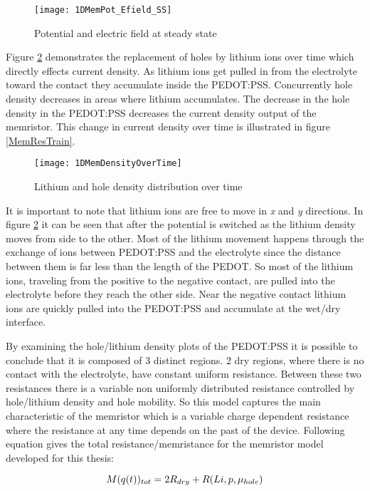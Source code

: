 \begin{doublespace}
\begin{figure}[!htp]
\centering
\texttt{[image: 1DMemPot\_Efield\_SS]}
\caption{Potential and electric field at steady state} 
\label{MemEss}
\end{figure}

Figure \ref{MempLi} demonstrates the replacement of holes by lithium ions over time which directly effects current density.  As lithium ions get pulled in from the electrolyte toward the contact they accumulate inside the PEDOT:PSS. Concurrently hole density decreases in areas where lithium accumulates. The decrease in the hole density in the PEDOT:PSS decreases the current density output of the memristor. This change in current density over time is illustrated in figure \ref{MemResTrain}.

\begin{figure}[!htp]
\centering
\texttt{[image: 1DMemDensityOverTime]}
\caption{Lithium and hole density distribution over time} 
\label{MempLi}
\end{figure}

It is important to note that lithium ions are free to move in \textit{x} and \textit{y} directions. In figure \ref{MempLi} it can be seen that after the potential is switched as the lithium density moves from  side to the other. Most of the lithium movement happens through the exchange of ions between PEDOT:PSS and the electrolyte since the distance between them is far less than the length of the PEDOT. So most of the lithium ions, traveling from the positive to the negative contact, are pulled into the electrolyte before they reach the other side. Near the negative contact lithium ions are quickly pulled into the PEDOT:PSS and accumulate at the wet/dry interface. 

By examining the hole/lithium density plots of the PEDOT:PSS it is possible to conclude that it is composed of 3 distinct regions. 2 dry regions, where there is no contact with the electrolyte, have constant uniform resistance. Between these two resistances there is a variable non uniformly distributed resistance controlled by hole/lithium density and hole mobility. So this model captures the main characteristic of the memristor which is a variable charge dependent resistance where the resistance at any time depends on the past of the device. Following equation gives the total resistance/memristance for the memristor model developed for this thesis:

\begin{equation}
\centering
M(q(t))_{tot}=2R_{dry}+R(Li,p,\mu_{hole})
\end{equation}


\end{doublespace}
